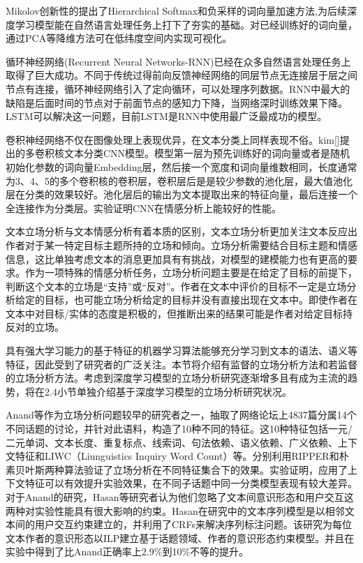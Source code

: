 Mikolov创新性的提出了Hierarchical Softmax和负采样的词向量加速方法,为后续深度学习模型能在自然语言处理任务上打下了夯实的基础。对已经训练好的词向量，通过PCA等降维方法可在低纬度空间内实现可视化。

循环神经网络(Recurrent Neural Networks-RNN)已经在众多自然语言处理任务上取得了巨大成功。不同于传统过得前向反馈神经网络的同层节点无连接层于层之间节点有连接，循环神经网络引入了定向循环，可以处理序列数据。RNN中最大的缺陷是后面时间的节点对于前面节点的感知力下降，当网络深时训练效果下降。LSTM可以解决这一问题，目前LSTM是RNN中使用最广泛最成功的模型。

卷积神经网络不仅在图像处理上表现优异，在文本分类上同样表现不俗。kim[]提出的多卷积核文本分类CNN模型。模型第一层为预先训练好的词向量或者是随机初始化参数的词向量Embedding层，然后接一个宽度和词向量维数相同，长度通常为3、4、5的多个卷积核的卷积层，卷积层后是是较少参数的池化层，最大值池化层在分类的效果较好。池化层后的输出为文本提取出来的特征向量，最后连接一个全连接作为分类层。实验证明CNN在情感分析上能较好的性能。

文本立场分析与文本情感分析有着本质的区别，文本立场分析更加关注文本反应出作者对于某一特定目标主题所持的立场和倾向。立场分析需要结合目标主题和情感信息，这比单独考虑文本的消息更加具有有挑战，对模型的建模能力也有更高的要求。作为一项特殊的情感分析任务，立场分析问题主要是在给定了目标的前提下，判断这个文本的立场是“支持”或“反对”。作者在文本中评价的目标不一定是立场分析给定的目标，也可能立场分析给定的目标并没有直接出现在文本中。即使作者在文本中对目标/实体的态度是积极的，但推断出来的结果可能是作者对给定目标持反对的立场。

具有强大学习能力的基于特征的机器学习算法能够充分学习到文本的语法、语义等特征，因此受到了研究者的广泛关注。本节将介绍有监督的立场分析方法和若监督的立场分析方法。考虑到深度学习模型的立场分析研究逐渐增多且有成为主流的趋势，将在2.4小节单独介绍基于深度学习模型的立场分析研究状况。



Anand等作为立场分析问题较早的研究者之一，抽取了网络论坛上4837篇分属14个不同话题的讨论，并针对此语料，构造了10种不同的特征。这10种特征包括一元/二元单词、文本长度、重复标点、线索词、句法依赖、语义依赖、广义依赖、上下文特征和LIWC（Liunguistics Inquiry Word Count）等。分别利用RIPPER和朴素贝叶斯两种算法验证了立场分析在不同特征集合下的效果。实验证明，应用了上下文特征可以有效提升实验效果，在不同子话题中同一分类模型表现有较大差异。对于Anand的研究，Hasan等研究者认为他们忽略了文本间意识形态和用户交互这两种对实验性能具有很大影响的约束。Hasan在研究中的文本序列模型是以相邻文本间的用户交互约束建立的，并利用了CRFs来解决序列标注问题。该研究为每位文本作者的意识形态以ILP建立基于话题领域、作者的意识形态约束模型。并且在实验中得到了比Anand正确率上2.9\%到10\%不等的提升。

